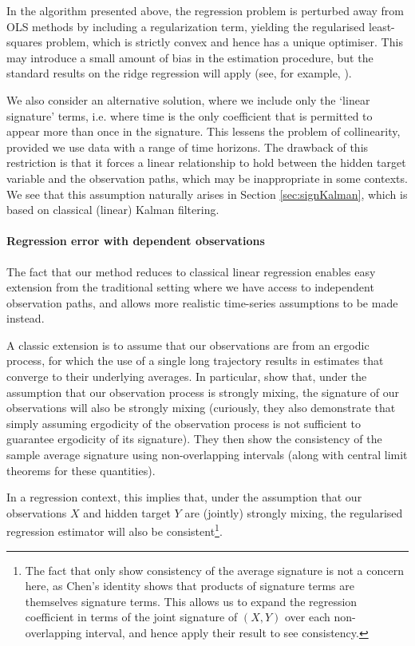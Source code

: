 \documentclass[a4paper, 12pt]{article}
\theoremstyle{remark}
\begin{document}
In the algorithm presented above, the regression problem is perturbed away from OLS methods by including a regularization term, yielding the regularised least-squares problem, which is strictly convex and hence has a unique optimiser. This may introduce a small amount of bias in the estimation procedure, but the standard results on the ridge regression will apply (see, for example, \cite{hsu2012random}).

We also consider an alternative solution, where we include only the `linear signature' terms, i.e. where time is the only coefficient that is permitted to appear more than once in the signature. This lessens the problem of collinearity, provided we use data with a range of time horizons. The drawback of this restriction is that it forces a linear relationship to hold between the hidden target variable and the observation paths, which may be inappropriate in some contexts. We see that this assumption naturally arises in Section \ref{sec:signKalman}, which is based on classical (linear) Kalman filtering.



\paragraph{Regression error with dependent observations}

The fact that our method reduces to classical linear regression enables easy extension from the traditional setting where we have access to independent observation paths, and allows more realistic time-series assumptions to be made instead.

A classic extension is to assume that our observations are from an ergodic process, for which the use of a single long trajectory results in estimates that converge to their underlying averages. In particular, \cite{lucchese2025learning} show that, under the assumption that our observation process is strongly mixing, the signature of our observations will also be strongly mixing (curiously, they also demonstrate that simply assuming ergodicity of the observation process is not sufficient to guarantee ergodicity of its signature). They then show the consistency of the sample average signature using non-overlapping intervals (along with central limit theorems for these quantities).

In a regression context, this implies that, under the assumption that our observations $X$ and hidden target $Y$ are (jointly) strongly mixing, the regularised regression estimator will also be consistent\footnote{The fact that \cite{lucchese2025learning} only show consistency of the average signature is not a concern here, as Chen's identity shows that products of signature terms are themselves signature terms. This allows us to expand the regression coefficient in terms of the joint signature of $(X,Y)$ over each non-overlapping interval, and hence apply their result to see consistency.}.
\end{document}
